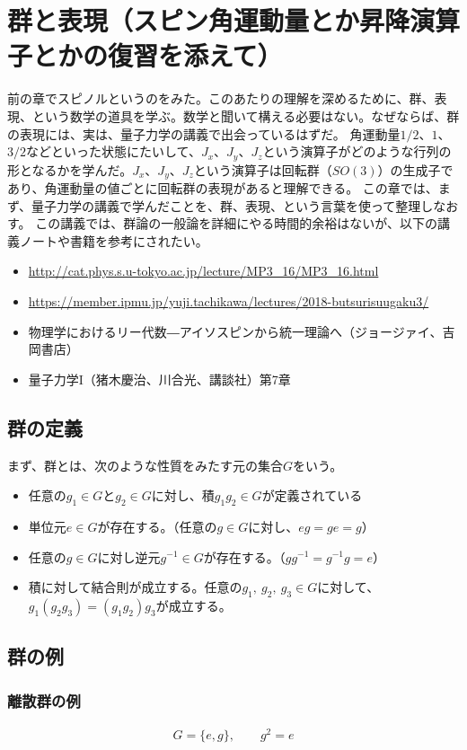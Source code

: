 \documentclass[10pt,a4paper]{jarticle}
\begin{document}
\section{群と表現（スピン角運動量とか昇降演算子とかの復習を添えて）}
前の章でスピノルというのをみた。このあたりの理解を深めるために、群、表現、という数学の道具を学ぶ。数学と聞いて構える必要はない。なぜならば、群の表現には、実は、量子力学の講義で出会っているはずだ。
角運動量$1/2$、$1$、$3/2$などといった状態にたいして、$J_x$、$J_y$、$J_z$という演算子がどのような行列の形となるかを学んだ。$J_x$、$J_y$、$J_z$という演算子は回転群（$SO(3)$）の生成子であり、角運動量の値ごとに回転群の表現があると理解できる。
この章では、まず、量子力学の講義で学んだことを、群、表現、という言葉を使って整理しなおす。
この講義では、群論の一般論を詳細にやる時間的余裕はないが、以下の講義ノートや書籍を参考にされたい。
\begin{itemize}
\item \url{http://cat.phys.s.u-tokyo.ac.jp/lecture/MP3_16/MP3_16.html}
\item \url{https://member.ipmu.jp/yuji.tachikawa/lectures/2018-butsurisuugaku3/}
\item 物理学におけるリー代数―アイソスピンから統一理論へ（ジョージァイ、吉岡書店）
\item 量子力学I（猪木慶治、川合光、講談社）第7章
\end{itemize}

\subsection{群の定義}
まず、群とは、次のような性質をみたす元の集合$G$をいう。
\begin{itemize}
\item 任意の$g_1 \in G$と$g_2 \in G$に対し、積$g_1 g_2 \in G$が定義されている
\item 単位元$e \in G$が存在する。（任意の$g\in G$に対し、$eg=ge=g$）
\item 任意の$g\in G$に対し逆元$g^{-1} \in G$が存在する。（$g g^{-1} = g^{-1} g = e$）
\item 積に対して結合則が成立する。任意の$g_1,~g_2,~g_3\in G$に対して、$g_1 (g_2 g_3) = (g_1 g_2) g_3$が成立する。
\end{itemize}

\subsection{群の例}
\subsubsection{離散群の例}
\begin{align}
G = \{e,g\}, \qquad g^2 = e
\end{align}
\end{document}
